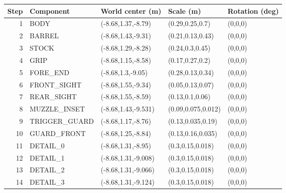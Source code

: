 \begin{center}\normalsize\begin{tabular}{rllll}\toprule
Step & Component & World center (m) & Scale (m) & Rotation (deg) \\\midrule
1 & BODY & (-8.68,1.37,-8.79) & (0.29,0.25,0.7) & (0,0,0) \\
2 & BARREL & (-8.68,1.43,-9.31) & (0.21,0.13,0.43) & (0,0,0) \\
3 & STOCK & (-8.68,1.29,-8.28) & (0.24,0.3,0.45) & (0,0,0) \\
4 & GRIP & (-8.68,1.15,-8.58) & (0.17,0.27,0.2) & (0,0,0) \\
5 & FORE\_END & (-8.68,1.3,-9.05) & (0.28,0.13,0.34) & (0,0,0) \\
6 & FRONT\_SIGHT & (-8.68,1.55,-9.34) & (0.05,0.13,0.07) & (0,0,0) \\
7 & REAR\_SIGHT & (-8.68,1.55,-8.59) & (0.13,0.1,0.06) & (0,0,0) \\
8 & MUZZLE\_INSET & (-8.68,1.43,-9.531) & (0.09,0.075,0.012) & (0,0,0) \\
9 & TRIGGER\_GUARD & (-8.68,1.17,-8.76) & (0.13,0.035,0.19) & (0,0,0) \\
10 & GUARD\_FRONT & (-8.68,1.25,-8.84) & (0.13,0.16,0.035) & (0,0,0) \\
11 & DETAIL\_0 & (-8.68,1.31,-8.95) & (0.3,0.15,0.018) & (0,0,0) \\
12 & DETAIL\_1 & (-8.68,1.31,-9.008) & (0.3,0.15,0.018) & (0,0,0) \\
13 & DETAIL\_2 & (-8.68,1.31,-9.066) & (0.3,0.15,0.018) & (0,0,0) \\
14 & DETAIL\_3 & (-8.68,1.31,-9.124) & (0.3,0.15,0.018) & (0,0,0) \\
\bottomrule\end{tabular}\end{center}
